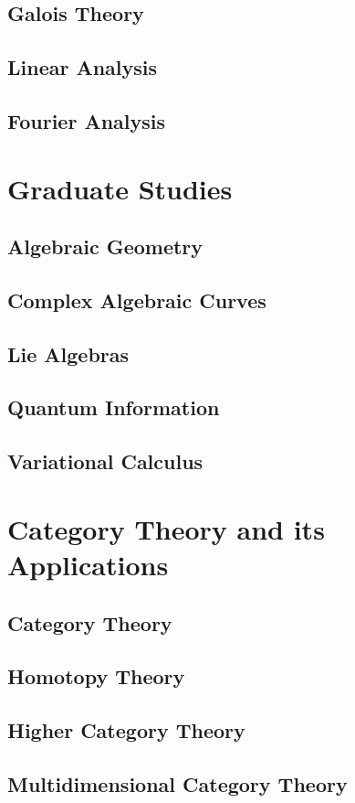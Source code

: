 \documentclass[12pt]{report}
\begin{document}
\chapter{Galois Theory}\label{cha:galois-theory}
\chapter{Linear Analysis}\label{cha:linear-analysis}
\chapter{Fourier Analysis}\label{cha:fourier-analysis}

\part{Graduate Studies}\label{part:graduate-studies}

\chapter{Algebraic Geometry}\label{cha:algebraic-geometry}
\chapter{Complex Algebraic Curves}\label{cha:compl-algebr-curv}
\chapter{Lie Algebras}\label{cha:lie-algebras}
\chapter{Quantum Information}\label{cha:quantum-information}
\chapter{Variational Calculus}\label{cha:variational-calculus}


\part{Category Theory and its Applications}\label{part:category-theory-its}
\chapter{Category Theory}\label{cha:category-theory}
\chapter{Homotopy Theory}\label{cha:homotopy-theory}
\chapter{Higher Category Theory}\label{cha:high-categ-theory}
\chapter{Multidimensional Category Theory}\label{cha:mult-categ-theory}

\printbibliography%
\end{document}
